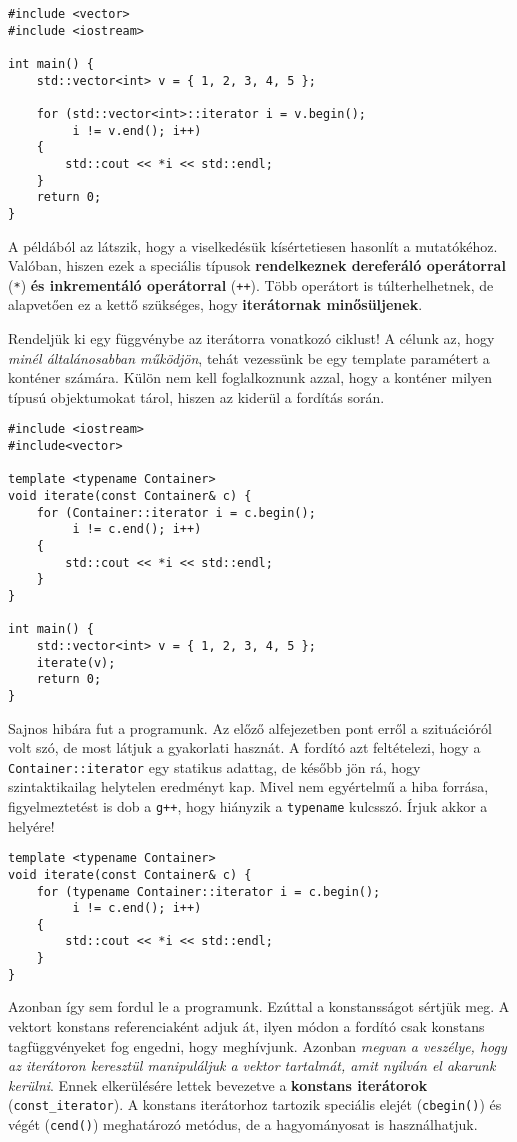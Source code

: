 \documentclass[a4paper, 11pt, oneside]{book}
\begin{document}
\begin{lstlisting}[style=cppstyle]
#include <vector>
#include <iostream>

int main() {
	std::vector<int> v = { 1, 2, 3, 4, 5 };
	
	for (std::vector<int>::iterator i = v.begin(); 
		 i != v.end(); i++) 
	{
		std::cout << *i << std::endl;
	}
	return 0;
}
\end{lstlisting}

A példából az látszik, hogy a viselkedésük kísértetiesen hasonlít a mutatókéhoz. Valóban, hiszen ezek a speciális típusok \textbf{rendelkeznek dereferáló operátorral} (\verb*|*|) \textbf{és inkrementáló operátorral} (\verb*|++|). Több operátort is túlterhelhetnek, de alapvetően ez a kettő szükséges, hogy \textbf{iterátornak minősüljenek}.

Rendeljük ki egy függvénybe az iterátorra vonatkozó ciklust! A célunk az, hogy \textit{minél általánosabban működjön}, tehát vezessünk be egy template paramétert a konténer számára. Külön nem kell foglalkoznunk azzal, hogy a konténer milyen típusú objektumokat tárol, hiszen az kiderül a fordítás során.

\begin{lstlisting}[style=cppstyle]
#include <iostream>
#include<vector>

template <typename Container>
void iterate(const Container& c) {
	for (Container::iterator i = c.begin(); 
		 i != c.end(); i++)
	{
		std::cout << *i << std::endl;
	}
}

int main() {
	std::vector<int> v = { 1, 2, 3, 4, 5 };
	iterate(v);
	return 0;
}
\end{lstlisting}

Sajnos hibára fut a programunk. Az előző alfejezetben pont erről a szituációról volt szó, de most látjuk a gyakorlati hasznát. A fordító azt feltételezi, hogy a \verb*|Container::iterator| egy statikus adattag, de később jön rá, hogy szintaktikailag helytelen eredményt kap. Mivel nem egyértelmű a hiba forrása, figyelmeztetést is dob a \verb*|g++|, hogy hiányzik a \verb*|typename| kulcsszó. Írjuk akkor a helyére!

\clearpage

\begin{lstlisting}[style=cppstyle]
template <typename Container>
void iterate(const Container& c) {
	for (typename Container::iterator i = c.begin(); 
		 i != c.end(); i++)
	{
		std::cout << *i << std::endl;
	}
}
\end{lstlisting}

Azonban így sem fordul le a programunk. Ezúttal a konstansságot sértjük meg. A vektort konstans referenciaként adjuk át, ilyen módon a fordító csak konstans tagfüggvényeket fog engedni, hogy meghívjunk. Azonban \textit{megvan a veszélye, hogy az iterátoron keresztül manipuláljuk a vektor tartalmát, amit nyilván el akarunk kerülni}. Ennek elkerülésére lettek bevezetve a \textbf{konstans iterátorok} (\verb*|const_iterator|). A konstans iterátorhoz tartozik speciális elejét (\texttt{cbegin()}) és végét (\texttt{cend()}) meghatározó metódus, de a hagyományosat is használhatjuk.
\end{document}
